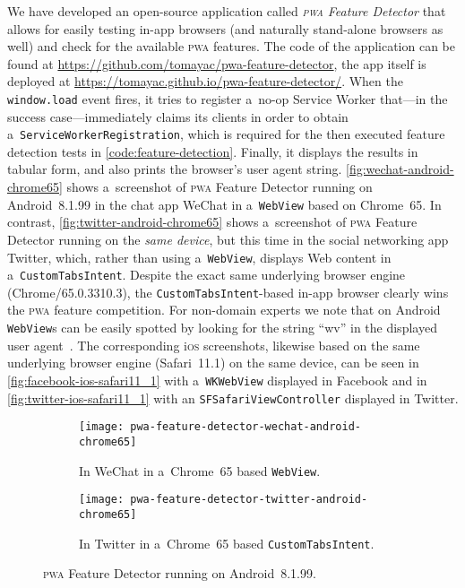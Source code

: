 \documentclass[sigconf,hyphens]{acmart}
\begin{document}
We have developed an open-source application called \emph{\textsc{pwa} Feature Detector}
that allows for easily testing in-app browsers (and naturally stand-alone browsers as well)
and check for the available \textsc{pwa} features.
The code of the application can be found at
\url{https://github.com/tomayac/pwa-feature-detector},
the app itself is deployed at \url{https://tomayac.github.io/pwa-feature-detector/}.
When the \texttt{window.load} event fires,
it tries to register a~no-op Service Worker
that---in the success case---immediately claims its clients
in order to obtain a~\texttt{ServiceWorkerRegistration},
which is required for the then executed feature detection tests
in \autoref{code:feature-detection}.
Finally, it displays the results in tabular form,
and also prints the browser's user agent string.
\autoref{fig:wechat-android-chrome65} shows a~screenshot of \textsc{pwa} Feature Detector
running on Android~8.1.99 in the chat app WeChat in a~\texttt{WebView} based on Chrome~65.
In contrast, \autoref{fig:twitter-android-chrome65} shows
a~screenshot of \textsc{pwa} Feature Detector
running on the \emph{same device}, but this time in the social networking app Twitter,
which, rather than using a~\texttt{WebView},
displays Web content in a~\texttt{CustomTabsIntent}.
Despite the exact same underlying browser engine (Chrome/65.0.3310.3),
the \texttt{CustomTabsIntent}-based in-app browser
clearly wins the \textsc{pwa} feature competition.
For non-domain experts we note that on Android \texttt{WebView}s
can be easily spotted by looking for the string
``wv'' in the displayed user agent~\cite{chrome2018useragent}.
The corresponding i\textsc{os} screenshots, likewise
based on the same underlying browser engine (Safari~11.1) on the same device,
can be seen in \autoref{fig:facebook-ios-safari11_1} with a~\texttt{WKWebView} displayed in Facebook 
and in \autoref{fig:twitter-ios-safari11_1} with an \texttt{SFSafariViewController}
displayed in Twitter.

\begin{figure}[t]
  \centering
  \begin{subfigure}[t]{0.475\columnwidth}
    \texttt{[image: pwa-feature-detector-wechat-android-chrome65]}
    \caption[\textsc{pwa} Feature Detector running in WeChat.]{
      In WeChat in a~Chrome~65 based \texttt{WebView}.}
    \label{fig:wechat-android-chrome65}
  \end{subfigure}    
  \quad
  \begin{subfigure}[t]{0.475\columnwidth}  
    \texttt{[image: pwa-feature-detector-twitter-android-chrome65]}
    \caption[\textsc{pwa} Feature Detector running in Twitter.]{
      In Twitter in a~Chrome~65 based \texttt{CustomTabsIntent}.}
    \label{fig:twitter-android-chrome65}
  \end{subfigure}
  \caption{\textsc{pwa} Feature Detector running on Android~8.1.99.}    
\end{figure}
\end{document}
